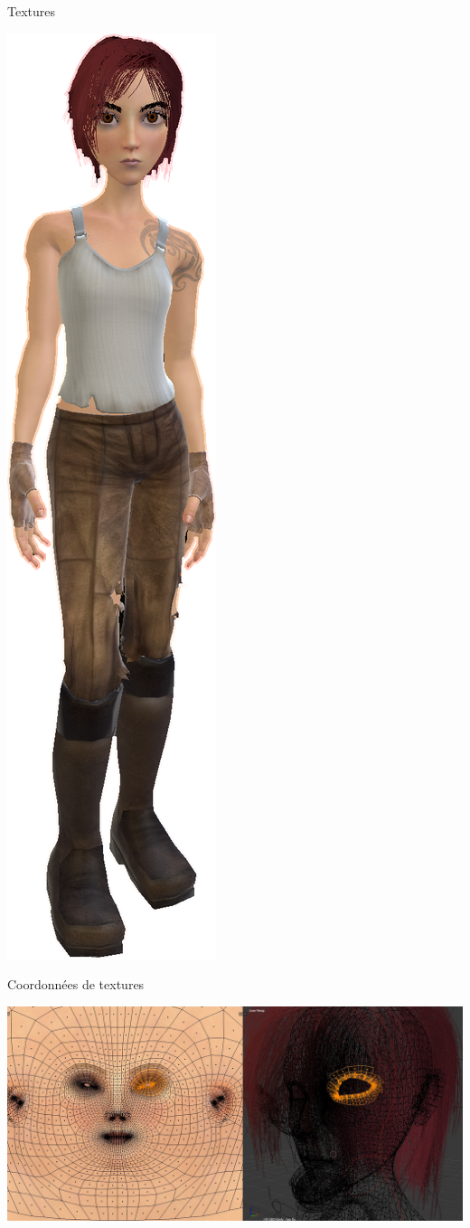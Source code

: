\documentclass[compress]{beamer}
\begin{document}
\begin{frame}{Textures}
\begin{center}
        \includegraphics[width=0.3\linewidth]{sintel-opengl-textures-transparent}
    \end{center}
\end{frame}


\begin{frame}{Coordonnées de textures}
    \begin{center}

        \includegraphics[width=1\linewidth]{texture_uvmap}
    \end{center}
\end{frame}
\end{document}
